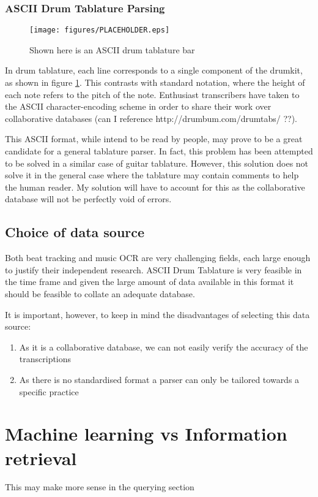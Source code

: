 \documentclass[12pt,twoside,notitlepage]{report}
\begin{document}
			\subsubsection{ASCII Drum Tablature Parsing}
						\begin{figure}[h]
			\centerline{\texttt{[image: figures/PLACEHOLDER.eps]}}
			\caption{\label{DrumTablature} Shown here is an ASCII drum tablature bar}
\end{figure}
				In drum tablature, each line corresponds to a single component of the drumkit, as shown in figure \ref{DrumTablature}. This contrasts with standard notation, where the height of each note refers to the pitch of the note. Enthusiast transcribers have taken to the ASCII character-encoding scheme in order to share their work over collaborative databases (can I reference http://drumbum.com/drumtabs/ ??).
				
				This ASCII format, while intend to be read by people, may prove to be a great candidate for a general tablature parser. In fact, this problem has been attempted to be solved in a similar case of guitar tablature\cite{Knowles2013}. However, this solution does not solve it in the general case where the tablature may contain comments to help the human reader. My solution will have to account for this as the collaborative database will not be perfectly void of errors.
		\subsection{\label{subsec:ChoiceOfDataSource}Choice of data source}
		Both beat tracking and music OCR are very challenging fields, each large enough to justify their independent research. ASCII Drum Tablature is very feasible in the time frame and given the large amount of data available in this format it should be feasible to collate an adequate database.
		
		It is important, however, to keep in mind the disadvantages of selecting this data source:
		\begin{enumerate}
			\item{As it is a collaborative database, we can not easily verify the accuracy of the transcriptions}
			\item{As there is no standardised format a parser can only be tailored towards a specific practice}
		\end{enumerate}
		
		
		
	\section{Machine learning vs Information retrieval}
	This may make more sense in the querying section
\end{document}
